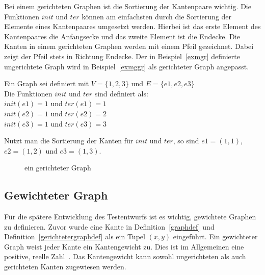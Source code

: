 Bei einem gerichteten Graphen ist die Sortierung der Kantenpaare wichtig.
Die Funktionen $init$ und $ter$ können am einfachsten durch die Sortierung der Elemente eines Kantenpaares umgesetzt werden.
Hierbei ist das erste Element des Kantenpaares die Anfangsecke und das zweite Element ist die Endecke.
Die Kanten in einem gerichteten Graphen werden mit einem Pfeil gezeichnet.
Dabei zeigt der Pfeil stets in Richtung Endecke.
Der in Beispiel~\ref{exmgr} definierte ungerichtete Graph wird in Beispiel~\ref{exmggr} als gerichteter Graph angepasst.

\begin{example}
    \label{exmggr}
    Ein Graph sei definiert mit $V = \{ 1, 2, 3 \}$ und $E = \{e1, e2, e3\}$ \\
    Die Funktionen $init$ und $ter$ sind definiert als: \\
    $init(e1) = 1$ und $ter(e1) = 1$ \\
    $init(e2) = 1$ und $ter(e2) = 2$ \\
    $init(e3) = 1$ und $ter(e3) = 3$ \\
\end{example}

Nutzt man die Sortierung der Kanten für $init$ und $ter$, so sind $e1 = (1,1)$, $e2 = (1,2)$ und $e3 = (1,3)$.

\begin{figure}[H]
    \begin{center}
    \end{center}
    \caption{ein gerichteter Graph}
    \label{graphexample}
\end{figure}

\subsection{Gewichteter Graph}

Für die spätere Entwicklung des Testentwurfs ist es wichtig, gewichtete Graphen zu definieren.
Zuvor wurde eine Kante in Definition~\ref{graphdef} und Definition~\ref{gerichtetergraphdef} als ein Tupel $(x, y)$ eingeführt.
Ein gewichteter Graph weist jeder Kante ein Kantengewicht zu.
Dies ist im Allgemeinen eine positive, reelle Zahl~\cite[vgl. S. 251]{graphentheorie3}.
Das Kantengewicht kann sowohl ungerichteten als auch gerichteten Kanten zugewiesen werden.

